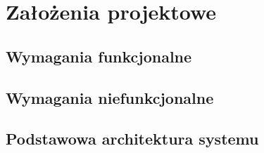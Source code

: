 \chapter{Założenia projektowe}
\section{Wymagania funkcjonalne}
\section{Wymagania niefunkcjonalne}
\section{Podstawowa architektura systemu}